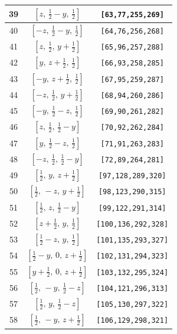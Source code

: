\documentclass[fleqn,8pt]{jsarticle}
\begin{document}
\begin{longtable}{ccc}
39 & $\left[ z,\, \frac{1}{2} - y,\, \frac{1}{2} \right]$ & {\tt [63,77,255,269]} \\ \hline
40 & $\left[ - z,\, \frac{1}{2} - y,\, \frac{1}{2} \right]$ & {\tt [64,76,256,268]} \\ \hline
41 & $\left[ z,\, \frac{1}{2},\, y + \frac{1}{2} \right]$ & {\tt [65,96,257,288]} \\ \hline
42 & $\left[ y,\, z + \frac{1}{2},\, \frac{1}{2} \right]$ & {\tt [66,93,258,285]} \\ \hline
43 & $\left[ - y,\, z + \frac{1}{2},\, \frac{1}{2} \right]$ & {\tt [67,95,259,287]} \\ \hline
44 & $\left[ - z,\, \frac{1}{2},\, y + \frac{1}{2} \right]$ & {\tt [68,94,260,286]} \\ \hline
45 & $\left[ - y,\, \frac{1}{2} - z,\, \frac{1}{2} \right]$ & {\tt [69,90,261,282]} \\ \hline
46 & $\left[ z,\, \frac{1}{2},\, \frac{1}{2} - y \right]$ & {\tt [70,92,262,284]} \\ \hline
47 & $\left[ y,\, \frac{1}{2} - z,\, \frac{1}{2} \right]$ & {\tt [71,91,263,283]} \\ \hline
48 & $\left[ - z,\, \frac{1}{2},\, \frac{1}{2} - y \right]$ & {\tt [72,89,264,281]} \\ \hline
49 & $\left[ \frac{1}{2},\, y,\, z + \frac{1}{2} \right]$ & {\tt [97,128,289,320]} \\ \hline
50 & $\left[ \frac{1}{2},\, - z,\, y + \frac{1}{2} \right]$ & {\tt [98,123,290,315]} \\ \hline
51 & $\left[ \frac{1}{2},\, z,\, \frac{1}{2} - y \right]$ & {\tt [99,122,291,314]} \\ \hline
52 & $\left[ z + \frac{1}{2},\, y,\, \frac{1}{2} \right]$ & {\tt [100,136,292,328]} \\ \hline
53 & $\left[ \frac{1}{2} - z,\, y,\, \frac{1}{2} \right]$ & {\tt [101,135,293,327]} \\ \hline
54 & $\left[ \frac{1}{2} - y,\, 0,\, z + \frac{1}{2} \right]$ & {\tt [102,131,294,323]} \\ \hline
55 & $\left[ y + \frac{1}{2},\, 0,\, z + \frac{1}{2} \right]$ & {\tt [103,132,295,324]} \\ \hline
56 & $\left[ \frac{1}{2},\, - y,\, \frac{1}{2} - z \right]$ & {\tt [104,121,296,313]} \\ \hline
57 & $\left[ \frac{1}{2},\, y,\, \frac{1}{2} - z \right]$ & {\tt [105,130,297,322]} \\ \hline
58 & $\left[ \frac{1}{2},\, - y,\, z + \frac{1}{2} \right]$ & {\tt [106,129,298,321]} \\ \hline

\end{longtable}
\end{document}
